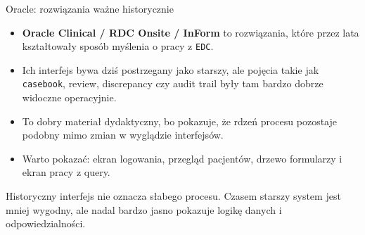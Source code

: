 \begin{frame}{Oracle: rozwiązania ważne historycznie}
  \begin{itemize}
    \item \textbf{Oracle Clinical / RDC Onsite / InForm} to rozwiązania, które przez lata kształtowały sposób myślenia o pracy z \texttt{EDC}.
    \item Ich interfejs bywa dziś postrzegany jako starszy, ale pojęcia takie jak \texttt{casebook}, review, discrepancy czy audit trail były tam bardzo dobrze widoczne operacyjnie.
    \item To dobry materiał dydaktyczny, bo pokazuje, że rdzeń procesu pozostaje podobny mimo zmian w wyglądzie interfejsów.
    \item Warto pokazać: ekran logowania, przegląd pacjentów, drzewo formularzy i ekran pracy z query.
  \end{itemize}

  \vspace{0.25cm}

  \begin{WarningBox}
    Historyczny interfejs nie oznacza słabego procesu. Czasem starszy system jest mniej wygodny, ale nadal bardzo jasno pokazuje logikę danych i odpowiedzialności.
  \end{WarningBox}
\end{frame}

